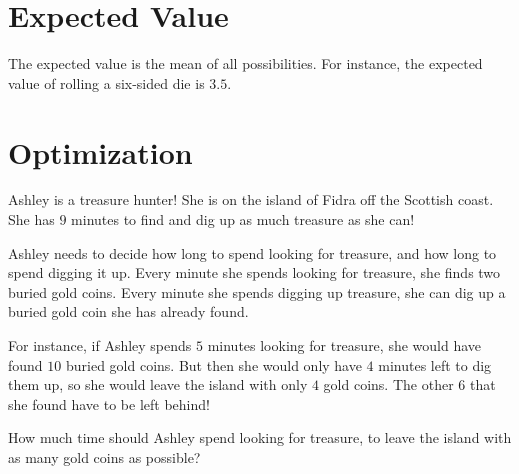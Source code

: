 \documentclass[a4paper,10pt]{report}
\begin{document}
\section{Expected Value}

The expected value is the mean of all possibilities. For instance, the expected
value of rolling a six-sided die is $3.5$.

\section{Optimization}

\begin{problem}{3}
  Ashley is a treasure hunter! She is on the island of Fidra off the Scottish coast. She
  has \(9\) minutes to find and dig up as much treasure as she can!

  Ashley needs to decide how long to spend looking for treasure, and how long to spend
  digging it up. Every minute she spends looking for treasure, she finds two buried gold
  coins. Every minute she spends digging up treasure, she can dig up a buried gold coin she
  has already found.

  For instance, if Ashley spends \(5\) minutes looking for treasure, she would have found
  \(10\) buried gold coins. But then she would only have \(4\) minutes left to dig them up,
  so she would leave the island with only \(4\) gold coins. The other \(6\) that she found
  have to be left behind!

  How much time should Ashley spend looking for treasure, to leave the island with as many
  gold coins as possible?
\end{problem}


\printglossaries

\cleardoublepage
{}
\listoffigures
\end{document}
